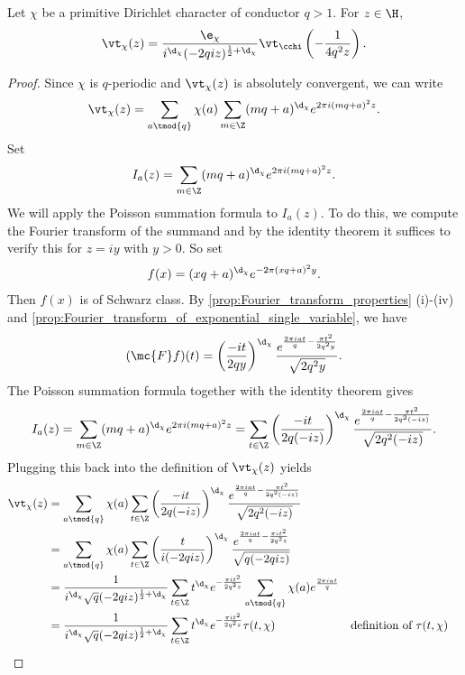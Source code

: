      \begin{theorem}\label{thm:functional_equation_Dirichlet_theta}
        Let \(\chi\) be a primitive Dirichlet character of conductor \(q > 1\). For \(z \in \H\),
        \[
          \vt_{\chi}(z) = \frac{\e_{\chi}}{i^{\d_{\chi}}(-2qiz)^{\frac{1}{2}+\d_{\chi}}}\vt_{\cchi}\left(-\frac{1}{4q^{2}z}\right).
        \]
      \end{theorem}
      \begin{proof}
        Since \(\chi\) is \(q\)-periodic and \(\vt_{\chi}(z)\) is absolutely convergent, we can write
        \[
          \vt_{\chi}(z) = \sum_{a \tmod{q}}\chi(a)\sum_{m \in \Z}(mq+a)^{\d_{\chi}}e^{2\pi i(mq+a)^{2}z}.
        \]
        Set
        \[
          I_{a}(z) = \sum_{m \in \Z}(mq+a)^{\d_{\chi}}e^{2\pi i(mq+a)^{2}z}.
        \]
        We will apply the Poisson summation formula to \(I_{a}(z)\). To do this, we compute the Fourier transform of the summand and by the identity theorem it suffices to verify this for \(z = iy\) with \(y > 0\). So set
        \[
          f(x) = (xq+a)^{\d_{\chi}}e^{-2\pi(xq+a)^{2}y}.
        \]
        Then \(f(x)\) is of Schwarz class. By \cref{prop:Fourier_transform_properties} (i)-(iv) and \cref{prop:Fourier_transform_of_exponential_single_variable}, we have
        \[
          (\mc{F}f)(t) = \left(\frac{-it}{2qy}\right)^{\d_{\chi}}\frac{e^{\frac{2\pi iat}{q}-\frac{\pi t^{2}}{2q^{2}y}}}{\sqrt{2q^{2}y}}.
        \]
        The Poisson summation formula together with the identity theorem gives
        \[
          I_{a}(z) = \sum_{m \in \Z}(mq+a)^{\d_{\chi}}e^{2\pi i(mq+a)^{2}z} = \sum_{t \in \Z}\left(\frac{-it}{2q(-iz)}\right)^{\d_{\chi}}\frac{e^{\frac{2\pi iat}{q}-\frac{\pi t^{2}}{2q^{2}(-iz)}}}{\sqrt{2q^{2}(-iz)}}.
        \]
        Plugging this back into the definition of \(\vt_{\chi}(z)\) yields
        \begin{align*}
          \vt_{\chi}(z) &= \sum_{a \tmod{q}}\chi(a)\sum_{t \in \Z}\left(\frac{-it}{2q(-iz)}\right)^{\d_{\chi}}\frac{e^{\frac{2\pi iat}{q}-\frac{\pi t^{2}}{2q^{2}(-iz)}}}{\sqrt{2q^{2}(-iz)}} \\
          &= \sum_{a \tmod{q}}\chi(a)\sum_{t \in \Z}\left(\frac{t}{i(-2qiz)}\right)^{\d_{\chi}}\frac{e^{\frac{2\pi iat}{q}-\frac{\pi it^{2}}{2q^{2}z}}}{\sqrt{q(-2qiz)}} \\
          &= \frac{1}{i^{\d_{\chi}}\sqrt{q}(-2qiz)^{\frac{1}{2}+\d_{\chi}}}\sum_{t \in \Z}t^{\d_{\chi}}e^{-\frac{\pi it^{2}}{2q^{2}z}}\sum_{a \tmod{q}}\chi(a)e^{\frac{2\pi i at}{q}} \\
          &= \frac{1}{i^{\d_{\chi}}\sqrt{q}(-2qiz)^{\frac{1}{2}+\d_{\chi}}}\sum_{t \in \Z}t^{\d_{\chi}}e^{-\frac{\pi it^{2}}{2q^{2}z}}\tau(t,\chi) && \text{definition of \(\tau(t,\chi)\)} \\

\end{align*}
\end{proof}
